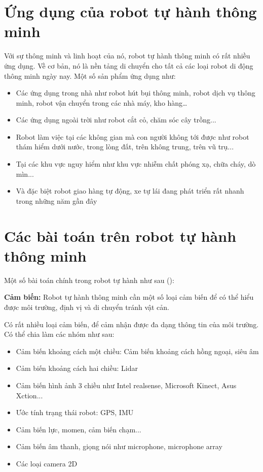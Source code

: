 
\section{Ứng dụng của robot tự hành thông minh}
\label{sec:ungdung}

Với sự thông minh và linh hoạt của nó, robot tự hành thông minh có rất nhiều ứng dụng. Về cơ bản, nó là nền tảng di chuyển cho tất cả các loại robot di động thông minh ngày nay. Một số sản phẩm ứng dụng như:

\begin{itemize}
  \item Các ứng dụng trong nhà như robot hút bụi thông minh, robot dịch vụ thông minh, robot vận chuyển trong các nhà máy, kho hàng\dots
  \item Các ứng dụng ngoài trời như robot cắt cỏ, chăm sóc cây trồng...
  \item Robot làm việc tại các không gian mà con người không tới được như robot thám hiểm dưới nước, trong lòng đất, trên không trung, trên vũ trụ...
  \item Tại các khu vực nguy hiểm như khu vực nhiễm chất phóng xạ, chữa cháy, dò mìn...
  \item Và đặc biệt robot giao hàng tự động, xe tự lái đang phát triển rất nhanh trong những năm gần đây
\end{itemize}

\section{Các bài toán trên robot tự hành thông minh}

Một số bài toán chính trong robot tự hành như sau (\cite{Wise}):

\textbf{Cảm biến:} Robot tự hành thông minh cần một số loại cảm biến để có thể hiểu được môi trường, định vị và di chuyển tránh vật cản.

Có rất nhiều loại cảm biến, để cảm nhận được đa dạng thông tin của môi trường. Có thể chia làm các nhóm như sau:
\begin{itemize}
\item Cảm biến khoảng cách một chiều: Cảm biến khoảng cách hồng ngoại, siêu âm
\item Cảm biến khoảng cách hai chiều: Lidar
\item Cảm biến hình ảnh 3 chiều như Intel realsense, Microsoft Kinect, Asus Xction...
\item Ước tính trạng thái robot: GPS, IMU
\item Cảm biến lực, momen, cảm biến chạm...
\item Cảm biến âm thanh, giọng nói như microphone, microphone array
\item Các loại camera 2D
\end{itemize}

